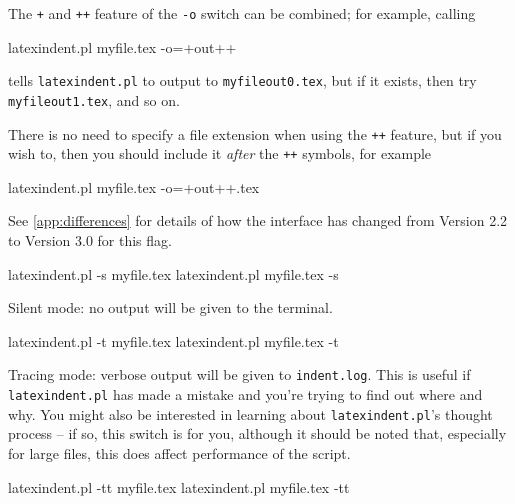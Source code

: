  The \texttt{+} and \texttt{++} feature of the \texttt{-o} switch can be combined; for
 example, calling

 \begin{commandshell}
latexindent.pl myfile.tex -o=+out++
\end{commandshell}

 tells \texttt{latexindent.pl} to output to \texttt{myfileout0.tex}, but if it exists,
 then try \texttt{myfileout1.tex}, and so on.

 There is no need to specify a file extension when using the \texttt{++} feature, but if
 you wish to, then you should include it \emph{after} the \texttt{++} symbols, for
 example

 \begin{commandshell}
latexindent.pl myfile.tex -o=+out++.tex
\end{commandshell}

 See \vref{app:differences} for details of how the interface has changed from Version 2.2
 to Version 3.0 for this flag.  

 \begin{commandshell}
latexindent.pl -s myfile.tex
latexindent.pl myfile.tex -s
\end{commandshell}

 Silent mode: no output will be given to the terminal.


 \begin{commandshell}
latexindent.pl -t myfile.tex
latexindent.pl myfile.tex -t
\end{commandshell}

 \label{page:traceswitch}
 Tracing mode: verbose output will be given to \texttt{indent.log}. This is useful if
 \texttt{latexindent.pl} has made a mistake and you're trying to find out where and why.
 You might also be interested in learning about \texttt{latexindent.pl}'s thought process
 -- if so, this switch is for you, although it should be noted that, especially for large
 files, this does affect performance of the script.


 \begin{commandshell}
latexindent.pl -tt myfile.tex
latexindent.pl myfile.tex -tt
\end{commandshell}

